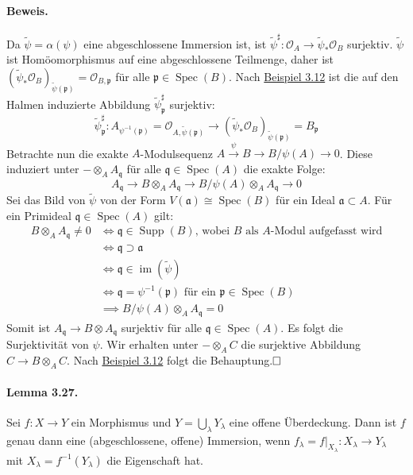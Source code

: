 \documentclass[11pt,b5paper,openany]{memoir}
\def \qed {$\hfill\square$}
\begin{document}
\paragraph{Beweis.} Da $\tilde{\psi}=\alpha(\psi)$ eine abgeschlossene Immersion ist, ist $\tilde{\psi}^\sharp:\mathcal{O}_A\to\tilde{\psi}_\ast\mathcal{O}_B$ surjektiv. $\tilde{\psi}$ ist Homöomorphismus auf eine abgeschlossene Teilmenge, daher ist $(\tilde{\psi}_\ast\mathcal{O}_B)_{\tilde{\psi}(\mathfrak{p})}=\mathcal{O}_{B,\mathfrak{p}}$ für alle $\mathfrak{p}\in\operatorname{Spec}(B)$. Nach \hyperref[3.12]{Beispiel 3.12} ist die auf den Halmen induzierte Abbildung $\tilde{\psi}^\sharp_\mathfrak{p}$ surjektiv:
\[\tilde{\psi}^\sharp_\mathfrak{p} : A_{\psi^{-1}(\mathfrak{p})}=\mathcal{O}_{A,\tilde{\psi}(\mathfrak{p})}\to (\tilde{\psi}_\ast\mathcal{O}_B)_{\tilde{\psi}(\mathfrak{p})}=B_\mathfrak{p} \]
Betrachte nun die exakte $A$-Modulsequenz $A\stackrel{\psi}{\to}B\to B/\psi(A)\to 0$. Diese induziert unter $-\otimes_AA_\mathfrak{q}$ für alle $\mathfrak{q}\in\operatorname{Spec}(A)$ die exakte Folge:
\[A_\mathfrak{q}\to B\otimes_A A_\mathfrak{q}\to B/\psi(A)\otimes_A A_\mathfrak{q}\to 0 \]
Sei das Bild von $\tilde{\psi}$ von der Form $V(\mathfrak{a})\cong\operatorname{Spec}(B)$ für ein Ideal $\mathfrak{a}\subset A$. Für ein Primideal $\mathfrak{q}\in\operatorname{Spec}(A)$ gilt:
\begin{align*}
B\otimes_A A_\mathfrak{q}\neq 0 &\iff \mathfrak{q}\in\operatorname{Supp}(B)\text{, wobei $B$ als $A$-Modul aufgefasst wird}\\
&\iff \mathfrak{q}\supset\mathfrak{a}\\
&\iff \mathfrak{q}\in\operatorname{im}(\tilde{\psi})\\
&\iff\mathfrak{q}=\psi^{-1}(\mathfrak{p})\text{ für ein }\mathfrak{p}\in\operatorname{Spec}(B)\\
&\implies B/\psi(A)\otimes_AA_\mathfrak{q}=0
\end{align*}
Somit ist $A_\mathfrak{q}\to B\otimes A_\mathfrak{q}$ surjektiv für alle $\mathfrak{q}\in\operatorname{Spec}(A)$. Es folgt die Surjektivität von $\psi$. Wir erhalten unter $-\otimes_AC$ die surjektive Abbildung $C\to B\otimes_AC$. Nach \hyperref[3.12]{Beispiel 3.12} folgt die Behauptung.\qed

\paragraph{Lemma 3.27.}\label{3.27} Sei $f:X\to Y$ ein Morphismus und $Y=\bigcup_\lambda Y_\lambda$ eine offene Überdeckung. Dann ist $f$ genau dann eine (abgeschlossene, offene) Immersion, wenn $f_\lambda=f|_{X_\lambda}:X_\lambda \to Y_\lambda$ mit $X_\lambda=f^{-1}(Y_\lambda)$ die Eigenschaft hat.
\end{document}
